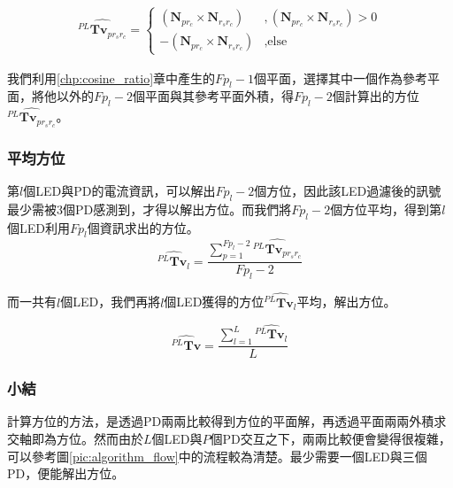         \begin{gather}
            \label{eqn:solve_axis}
             \hat{{^{PL}\boldsymbol{Tv}}_{p{r_sr_c}}} = 
             \begin{cases}
                (\boldsymbol{N}_{pr_c}\times \boldsymbol{N}_{r_sr_c})&,(\boldsymbol{N}_{pr_c}\times \boldsymbol{N}_{r_sr_c})>0\\
                -(\boldsymbol{N}_{pr_c}\times \boldsymbol{N}_{r_sr_c})&,\text{else}
             \end{cases}
        \end{gather}

        我們利用\ref{chp:cosine_ratio}章中產生的$Fp_l-1$個平面，選擇其中一個作為參考平面，將他以外的$Fp_l-2$個平面與其參考平面外積，得$Fp_l-2$個計算出的方位$\hat{{^{PL}\boldsymbol{Tv}}_{p{r_sr_c}}}$。


    \subsubsection{平均方位}
    \label{chp:orient_average}

        第$l$個LED與PD的電流資訊，可以解出$Fp_l-2$個方位，因此該LED過濾後的訊號最少需被3個PD感測到，才得以解出方位。而我們將$Fp_l-2$個方位平均，得到第$l$個LED利用$Fp_l$個資訊求出的方位。
        \begin{equation}
            \label{eqn:average_orient_led}
            \hat{{^{PL}\boldsymbol{Tv}}_{l}} = \frac{\sum^{Fp_l-2}_{p=1}\hat{{^{PL}\boldsymbol{Tv}}_{p{r_sr_c}}}}{Fp_l-2}
        \end{equation}

        而一共有$l$個LED，我們再將$l$個LED獲得的方位$\hat{{^{PL}\boldsymbol{Tv}}_{l}}$平均，解出方位。

        \begin{equation}
            \label{eqn:average_orient}
            \hat{{^{PL}\boldsymbol{Tv}}} = \frac{\sum^{L}_{l=1}\hat{{^{PL}\boldsymbol{Tv}}_{l}}}{L}
        \end{equation}
        
        
    \subsubsection{小結}
    \label{chp:orient_conclu}

    計算方位的方法，是透過PD兩兩比較得到方位的平面解，再透過平面兩兩外積求交軸即為方位。然而由於$L$個LED與$P$個PD交互之下，兩兩比較便會變得很複雜，可以參考圖\ref{pic:algorithm_flow}中的流程較為清楚。最少需要一個LED與三個PD，便能解出方位。

